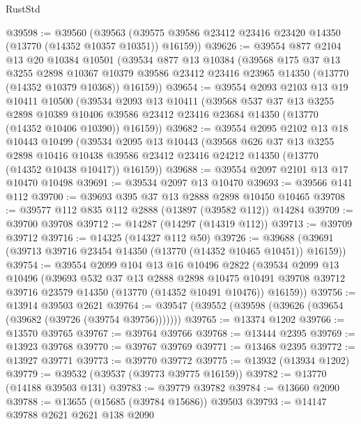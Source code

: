 \begin{lexlean}{RustStd}
\begin{coremodule}
@39598 := @39560
    (@39563 (@39575 @39586 @23412 @23416 @23420 @14350 (@13770 (@14352 @10357 @10351)) @16159))
@39626 := @39554
    @877
    @2104
    @13
    @20
    @10384
    @10501
    (@39534
      @877
      @13
      @10384
      (@39568
        @175
        @37
        @13
        @3255
        @2898
        @10367
        @10379
        @39586
        @23412
        @23416
        @23965
        @14350
        (@13770 (@14352 @10379 @10368))
        @16159))
@39654 := @39554
    @2093
    @2103
    @13
    @19
    @10411
    @10500
    (@39534
      @2093
      @13
      @10411
      (@39568
        @537
        @37
        @13
        @3255
        @2898
        @10389
        @10406
        @39586
        @23412
        @23416
        @23684
        @14350
        (@13770 (@14352 @10406 @10390))
        @16159))
@39682 := @39554
    @2095
    @2102
    @13
    @18
    @10443
    @10499
    (@39534
      @2095
      @13
      @10443
      (@39568
        @626
        @37
        @13
        @3255
        @2898
        @10416
        @10438
        @39586
        @23412
        @23416
        @24212
        @14350
        (@13770 (@14352 @10438 @10417))
        @16159))
@39688 := @39554 @2097 @2101 @13 @17 @10470 @10498
@39691 := @39534 @2097 @13 @10470
@39693 := @39566 @141 @112
@39700 := @39693 @395 @37 @13 @2888 @2898 @10450 @10465
@39708 := @39577 @112 @835 @112 @2888 (@13897 (@39582 @112)) @14284
@39709 := @39700 @39708
@39712 := @14287 (@14297 (@14319 @112))
@39713 := @39709 @39712
@39716 := @14325 (@14327 @112 @50)
@39726 := @39688 (@39691 (@39713 @39716 @23454 @14350 (@13770 (@14352 @10465 @10451)) @16159))
@39754 := @39554
    @2099
    @104
    @13
    @16
    @10496
    @2822
    (@39534
      @2099
      @13
      @10496
      (@39693
        @532
        @37
        @13
        @2888
        @2898
        @10475
        @10491
        @39708
        @39712
        @39716
        @23579
        @14350
        (@13770 (@14352 @10491 @10476))
        @16159))
@39756 := @13914 @39503 @2621
@39764 := @39547 (@39552 (@39598 (@39626 (@39654 (@39682 (@39726 (@39754 @39756)))))))
@39765 := @13374 @1202
@39766 := @13570 @39765
@39767 := @39764 @39766
@39768 := @13444 @2395
@39769 := @13923 @39768
@39770 := @39767 @39769
@39771 := @13468 @2395
@39772 := @13927 @39771
@39773 := @39770 @39772
@39775 := @13932 (@13934 @1202)
@39779 := @39532 (@39537 (@39773 @39775 @16159))
@39782 := @13770 (@14188 @39503 @131)
@39783 := @39779 @39782
@39784 := @13660 @2090
@39788 := @13655 (@15685 (@39784 @15686)) @39503
@39793 := @14147 @39788 @2621 @2621 @138 @2090

\end{coremodule}
\end{lexlean}
